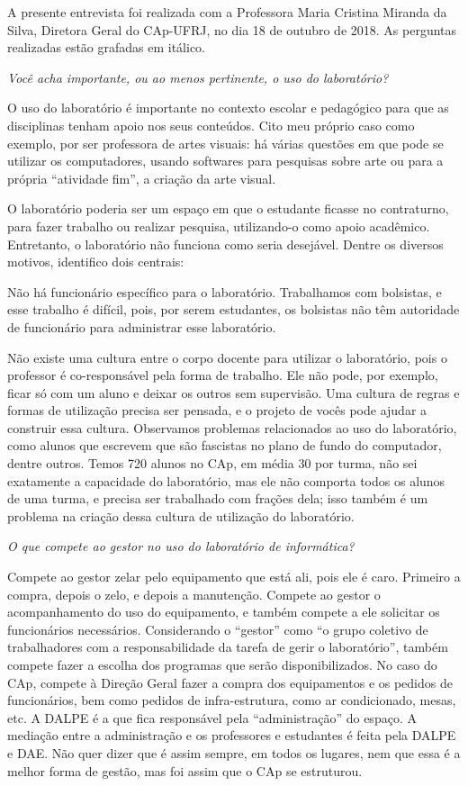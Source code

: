 \label{anx:LABEL_ANX_A}

A presente entrevista foi realizada com a Professora Maria Cristina Miranda da Silva, Diretora Geral do CAp-UFRJ, no dia 18 de outubro de 2018. As perguntas realizadas estão grafadas em itálico.

\textit{Você acha importante, ou ao menos pertinente, o uso do laboratório?}

O uso do laboratório é importante no contexto escolar e pedagógico para que as disciplinas tenham apoio nos seus conteúdos. Cito meu próprio caso como exemplo, por ser professora de artes visuais: há várias questões em que pode se utilizar os computadores, usando softwares para pesquisas sobre arte ou para a própria “atividade fim”, a criação da arte visual.

O laboratório poderia ser um espaço em que o estudante ficasse no contraturno, para fazer trabalho ou realizar pesquisa, utilizando-o como apoio acadêmico. Entretanto, o laboratório não funciona como seria desejável. Dentre os diversos motivos, identifico dois centrais:

Não há funcionário específico para o laboratório. Trabalhamos com bolsistas, e esse trabalho é difícil, pois, por serem estudantes, os bolsistas não têm autoridade de funcionário para administrar esse laboratório.

Não existe uma cultura entre o corpo docente para utilizar o laboratório, pois o professor é co-responsável pela forma de trabalho. Ele não pode, por exemplo, ficar só com um aluno e deixar os outros sem supervisão. Uma cultura de regras e formas de utilização precisa ser pensada, e o projeto de vocês pode ajudar a construir essa cultura. Observamos problemas relacionados ao uso do laboratório, como alunos que escrevem que são fascistas no plano de fundo do computador, dentre outros. Temos 720 alunos no CAp, em média 30 por turma, não sei exatamente a capacidade do laboratório, mas ele não comporta todos os alunos de uma turma, e precisa ser trabalhado com frações dela; isso também é um problema na criação dessa cultura de utilização do laboratório.

\textit{O que compete ao gestor no uso do laboratório de informática?}

Compete ao gestor zelar pelo equipamento que está ali, pois ele é caro. Primeiro a compra, depois o zelo, e depois a manutenção. Compete ao gestor o acompanhamento do uso do equipamento, e também compete a ele solicitar os funcionários necessários. Considerando o “gestor” como “o grupo coletivo de trabalhadores com a responsabilidade da tarefa de gerir o laboratório”, também compete fazer a escolha dos programas que serão disponibilizados. No caso do CAp, compete à Direção Geral fazer a compra dos equipamentos e os pedidos de funcionários, bem como pedidos de infra-estrutura, como ar condicionado, mesas, etc. A DALPE é a que fica responsável pela “administração” do espaço. A mediação entre a administração e os professores e estudantes é feita pela DALPE e DAE. Não quer dizer que é assim sempre, em todos os lugares, nem que essa é a melhor forma de gestão, mas foi assim que o CAp se estruturou. 

